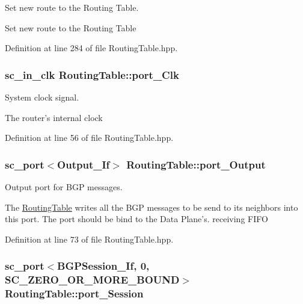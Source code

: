 Set new route to the Routing Table. 

Set new route to the Routing Table 

Definition at line 284 of file Routing\-Table.\-hpp.

\hypertarget{classRoutingTable_a3f57617a0dbdfabc34534eda6731da74}{
\subsubsection[{port\-\_\-\-Clk}]{\setlength{\rightskip}{0pt plus 5cm}sc\-\_\-in\-\_\-clk Routing\-Table\-::port\-\_\-\-Clk}}\label{classRoutingTable_a3f57617a0dbdfabc34534eda6731da74}


System clock signal. 

The router's internal clock 

Definition at line 56 of file Routing\-Table.\-hpp.

\hypertarget{classRoutingTable_ac463a755c9a322a1641ae0422ee845e3}{
\subsubsection[{port\-\_\-\-Output}]{\setlength{\rightskip}{0pt plus 5cm}sc\-\_\-port$<${\bf Output\-\_\-\-If}$>$ Routing\-Table\-::port\-\_\-\-Output}}\label{classRoutingTable_ac463a755c9a322a1641ae0422ee845e3}


Output port for B\-G\-P messages. 

The \hyperlink{classRoutingTable}{Routing\-Table} writes all the B\-G\-P messages to be send to its neighbors into this port. The port should be bind to the Data Plane's. receiving F\-I\-F\-O 

Definition at line 73 of file Routing\-Table.\-hpp.

\hypertarget{classRoutingTable_af24047fc955ca1e81caee0468f70f62c}{
\subsubsection[{port\-\_\-\-Session}]{\setlength{\rightskip}{0pt plus 5cm}sc\-\_\-port$<${\bf B\-G\-P\-Session\-\_\-\-If}, 0, S\-C\-\_\-\-Z\-E\-R\-O\-\_\-\-O\-R\-\_\-\-M\-O\-R\-E\-\_\-\-B\-O\-U\-N\-D$>$ Routing\-Table\-::port\-\_\-\-Session}}\label{classRoutingTable_af24047fc955ca1e81caee0468f70f62c}


